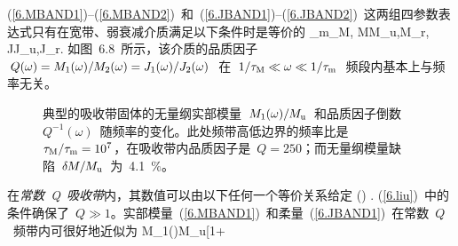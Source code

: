 (\ref{6.MBAND1})--(\ref{6.MBAND2})~和~(\ref{6.JBAND1})--(\ref{6.JBAND2})~这两组四参数表达式只有在宽带、弱衰减介质满足以下条件时是等价的
\eq \label{6.liu}
\tau_{\rm m}\ll\tau_{\rm M},\qquad
\delta\hspace{-0.2 mm}M\ll M_{\rm u},M_{\rm r},\qquad
\delta\hspace{-0.2 mm}J\ll J_{\rm u},J_{\rm r}.
\en
如图~6.8~所示，该介质的品质因子~$Q(\omega)=M_1(\omega)/M_2(\omega)=J_1(\mbox{$\omega$})/J_2(\mbox{$\omega$})$~在~$1/\tau_{\rm M}\ll\omega\ll 1/\tau_{\rm m}$~频段内基本上与频率无关。
\begin{figure}[!b]
\begin{center}
\end{center}
\caption[absorption band]{
典型的吸收带固体的无量纲实部模量~$M_1(\omega)/M_{\rm u}$~和品质因子倒数~$Q^{-1}(\omega)$~随频率的变化。此处频带高低边界的频率比是~$\tau_{\rm M}/\tau_{\rm m}=10^7$，在吸收带内品质因子是~$Q=250$；而无量纲模量缺陷~$\delta\hspace{-0.2 mm}M/M_{\rm u}$~为~4.1~$\%$。
}
\end{figure}
在{\em 常数~Q~吸收带\/}内，其数值可以由以下任何一个等价关系给定
\eq
{}\ln\left(\right)
\approx{}
\approx{}
\approx{}
\approx{}.
\en
(\ref{6.liu})~中的条件确保了~$Q\gg 1$。实部模量~(\ref{6.MBAND1})~和柔量~(\ref{6.JBAND1})~在常数~$Q$~频带内可很好地近似为
\eq
\label{6.DISPER}
M_1(\omega)\approx M_{\rm u}\left[1+
